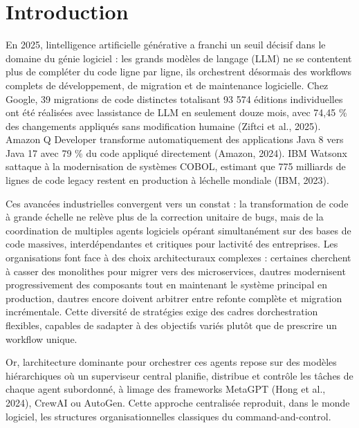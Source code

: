 
\chapter{Introduction}\label{chap:introduction}

En 2025, l\textquotesingle intelligence artificielle générative a
franchi un seuil décisif dans le domaine du génie logiciel : les grands
modèles de langage (LLM) ne se contentent plus de compléter du code
ligne par ligne, ils orchestrent désormais des workflows complets de
développement, de migration et de maintenance logicielle. Chez Google,
39 migrations de code distinctes totalisant 93 574 éditions
individuelles ont été réalisées avec l\textquotesingle assistance de LLM
en seulement douze mois, avec 74,45 \% des changements appliqués sans
modification humaine (Ziftci et al., 2025). Amazon Q Developer
transforme automatiquement des applications Java 8 vers Java 17 avec 79
\% du code appliqué directement (Amazon, 2024). IBM Watsonx
s\textquotesingle attaque à la modernisation de systèmes COBOL, estimant
que 775 milliards de lignes de code legacy restent en production à
l\textquotesingle échelle mondiale (IBM, 2023).

Ces avancées industrielles convergent vers un constat : la
transformation de code à grande échelle ne relève plus de la correction
unitaire de bugs, mais de la coordination de multiples agents logiciels
opérant simultanément sur des bases de code massives, interdépendantes
et critiques pour l\textquotesingle activité des entreprises.
Les organisations font face à des choix architecturaux complexes :
certaines cherchent à casser des monolithes pour migrer vers des
microservices, d\textquotesingle autres modernisent progressivement
des composants tout en maintenant le système principal en production,
d\textquotesingle autres encore doivent arbitrer entre refonte complète
et migration incrémentale. Cette diversité de stratégies exige des
cadres d\textquotesingle orchestration flexibles, capables de
s\textquotesingle adapter à des objectifs variés plutôt que de
prescrire un workflow unique.

Or, l\textquotesingle architecture dominante pour orchestrer ces agents
repose sur des modèles hiérarchiques où un superviseur central planifie,
distribue et contrôle les tâches de chaque agent subordonné, à
l\textquotesingle image des frameworks MetaGPT (Hong et al., 2024),
CrewAI ou AutoGen. Cette approche centralisée reproduit, dans le monde
logiciel, les structures organisationnelles classiques du
command-and-control.

